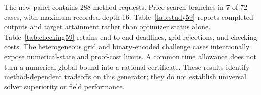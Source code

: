 The new panel contains 288 method requests. Price search branches in 7 of 72 cases, with maximum recorded depth 16. Table~\ref{tab:study59} reports completed outputs and target attainment rather than optimizer status alone. Table~\ref{tab:checking59} retains end-to-end deadlines, grid rejections, and checking costs. The heterogeneous grid and binary-encoded challenge cases intentionally expose numerical-state and proof-cost limits. A common time allowance does not turn a numerical global bound into a rational certificate. These results identify method-dependent tradeoffs on this generator; they do not establish universal solver superiority or field performance.
